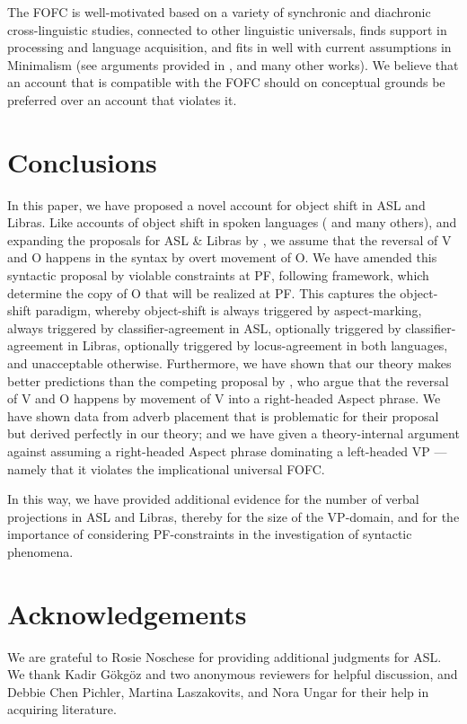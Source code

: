 \documentclass[output=paper,colorlinks,citecolor=brown,
]{langscibook}
\begin{document}
The FOFC is well-motivated based on a variety of synchronic
and diachronic cross-linguistic studies, connected to other linguistic
universals, finds support in processing and language acquisition, and
fits in well with current assumptions in Minimalism (see arguments
provided in \citealp{BiberauerHR.2014,SheehanBRH.2017}, and many other
works). We believe that an account that is compatible with the FOFC
should on conceptual grounds be preferred over an account that
violates it.

\section{Conclusions}
\label{lasz:sec:4}

In this paper, we have proposed a novel account for object shift in
ASL and Libras. Like accounts of object shift in spoken languages
(\citealp{Holmberg:1986} and many others), and expanding the proposals for
ASL \& Libras by \citet{Quadros.1999,Quadros.etal.2004,Quadros.DLM.2010,Gokgoz.2013}, 
we assume that the reversal
of V and O happens in the syntax by overt movement of O. We have
amended this syntactic proposal by violable constraints at PF,
following  framework, which
determine the copy of O that will be realized at PF. This captures the
object-shift paradigm, whereby object-shift is always triggered by
aspect-marking, always triggered by classifier-agreement in ASL,
optionally triggered by classifier-agreement in Libras, optionally
triggered by locus-agreement in both languages, and unacceptable
otherwise. Furthermore, we have shown that our theory makes better
predictions than the competing proposal by 
\citet{Fischer.Janis.1992,Matsuoka.1997,Braze.2004}, 
who argue that the reversal of V
and O happens by movement of V into a right-headed Aspect phrase.
We have shown data from adverb placement that is problematic for
their proposal but derived perfectly in our theory; and we have given a
theory-internal argument against assuming a right-headed Aspect
phrase dominating a left-headed VP --- namely that it violates the
implicational universal FOFC.

In this way, we have provided additional evidence for the
number of verbal projections in ASL and Libras, thereby for the size
of the VP-domain, and for the importance of considering
PF-constraints in the investigation of syntactic phenomena.

\section*{Acknowledgements}

We are grateful to Rosie Noschese for providing additional judgments
for ASL. We thank Kadir Gökgöz and two anonymous reviewers for
helpful discussion, and Debbie Chen Pichler, Martina Laszakovits, and
Nora Ungar for their help in acquiring literature. 

\printbibliography[heading=subbibliography,notkeyword=this]
\end{document}
